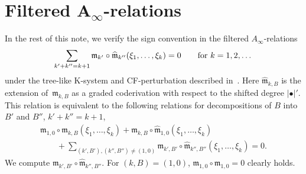 \documentclass[pdftex]{sigma}
\numberwithin{equation}{section}
\theoremstyle{definition}
\begin{document}
\section[Filtered A\_{infty}-relations]{Filtered $\boldsymbol{A_{\infty}}$-relations}
 In the rest of this note, we verify the sign convention in the filtered $A_{\infty}$-relations
 \begin{equation*}%
\sum_{k' + k'' = k+1} {\mathfrak m}_{k'} \circ \widehat{\mathfrak m}_{k''} (\xi_1, \dots, \xi_k) = 0 \qquad {\rm for} \ k=1,2, \dots
\end{equation*}
under the tree-like K-system and CF-perturbation described in~\cite{FOOO20}.
Here $\hat{\mathfrak m}_{k,B}$ is the extension of~${\mathfrak m}_{k,B}$ as a graded coderivation with respect to the shifted degree $\vert \bullet \vert'$.
This relation is equivalent to the following relations for decompositions of $B$ into $B'$ and $ B''$, $k'+k''=k+1$,
\begin{gather*}
 {\mathfrak m}_{1,0} \circ {\mathfrak m}_{k, B} (\xi_1, \dots, \xi_k) + {\mathfrak m}_{k,B} \circ \hat{\mathfrak m}_{1,0} (\xi_1, \dots, \xi_k)  \\
\qquad{} + \sum_{(k',B'), (k'', B'') \neq (1,0)} {\mathfrak m}_{k',B'} \circ \hat{\mathfrak m}_{k'',B''} (\xi_1, \dots, \xi_k) = 0.
\end{gather*}
We compute ${\mathfrak m}_{k',B'} \circ \hat{\mathfrak m}_{k'', B''}$.
For $(k,B)=(1,0)$, ${\mathfrak m}_{1,0} \circ {\mathfrak m}_{1,0} = 0$ clearly holds.
\end{document}
